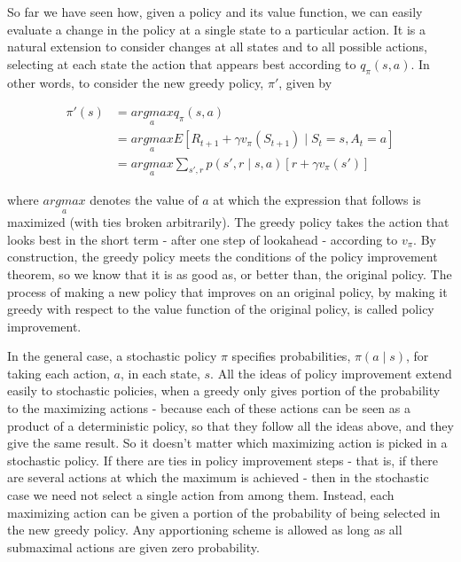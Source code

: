 \documentclass{article}
\begin{document}
So far we have seen how, given a policy and its value function, we can easily evaluate a change in the policy at a single state to a particular action. 
It is a natural extension to consider changes at all states and to all possible actions, selecting at each state the action that appears best according to \(q_{\pi}(s,a)\). 
In other words, to consider the new greedy policy, \(\pi'\), given by

\begin{equation*}
\begin{split}
\pi'(s)
& = \underset{a}{argmax} q_{\pi}(s, a) \\
& = \underset{a}{argmax} E[R_{t + 1} + \gamma v_{\pi}(S_{t + 1}) \mid S_t = s, A_t = a] \\
& = \underset{a}{argmax} \sum_{s', r} p(s', r \mid s, a) [r + \gamma v_{\pi}(s')]
\end{split}
\end{equation*}

where \(\underset{a}{argmax}\) denotes the value of \(a\) at which the expression that follows is maximized (with ties broken arbitrarily). 
The greedy policy takes the action that looks best in the short term - after one step of lookahead - according to \(v_{\pi}\). 
By construction, the greedy policy meets the conditions of the policy improvement theorem, so we know that it is as good as, or better than, the original policy. 
The process of making a new policy that improves on an original policy, by making it greedy with respect to the value function of the original policy, is called policy improvement.

In the general case, a stochastic policy \(\pi\) specifies probabilities, \(\pi(a \mid s)\), for taking each action, \(a\), in each state, \(s\). 
All the ideas of policy improvement extend easily to stochastic policies, when a greedy only gives portion of the probability to the maximizing actions - 
because each of these actions can be seen as a product of a deterministic policy, so that they follow all the ideas above, and they give the same result. 
So it doesn't matter which maximizing action is picked in a stochastic policy. 
If there are ties in policy improvement steps - that is, if there are several actions at which the maximum is achieved - 
then in the stochastic case we need not select a single action from among them. Instead, each maximizing action can be given a portion of the probability of being selected in the new greedy policy. 
Any apportioning scheme is allowed as long as all submaximal actions are given zero probability.
\end{document}
